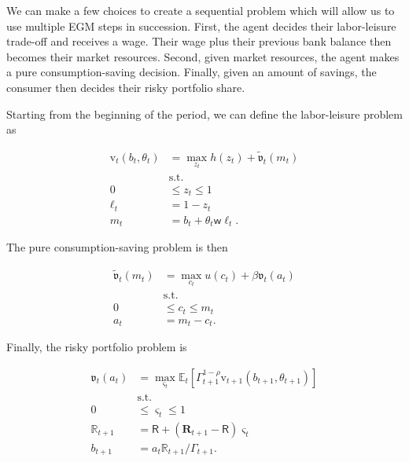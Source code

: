 \documentclass{article}
\newcommand{\DiscFac}{\beta}
\newcommand{\util}{u}
\newcommand{\tShkEmp}{\theta}
\newcommand{\Ex}{\mathbb{E}}
\newcommand{\CRRA}{\rho}
\newcommand{\h}{h}
\newcommand{\bRat}{b}
\newcommand{\leisure}{z}
\newcommand{\cRat}{c}
\newcommand{\vFunc}{\mathrm{v}}
\newcommand{\Rfree}{\mathsf{R}}
\newcommand{\wage}{\mathsf{w}}
\newcommand{\riskyshare}{\varsigma}
\newcommand{\PGro}{\Gamma}
\newcommand{\labor}{\ell}
\newcommand{\aRat}{a}
\newcommand{\mRat}{m}
\newcommand{\Rport}{\mathbb{R}}
\newcommand{\Risky}{\mathbf{R}}
\newcommand{\vOpt}{\tilde{\mathfrak{v}}}
\newcommand{\vEnd}{\mathfrak{v}}
\begin{document}
We can make a few choices to create a sequential problem which will allow us to use multiple EGM steps in succession. First, the
agent decides their labor-leisure trade-off and receives a wage. Their wage
plus their previous bank balance then becomes their market resources. Second, given
market resources, the agent makes a pure consumption-saving decision. Finally, given an amount of savings, the consumer then decides their risky portfolio share.

Starting from the beginning of the period, we can define the labor-leisure problem as

\begin{equation}
\begin{split}
    \vFunc_{t}(\bRat_{t}, \tShkEmp_{t}) & = \max_{ \leisure_{t}}
    \h(\leisure_{t}) + \vOpt_{t} (\mRat_{t}) \\
    & \text{s.t.} \\
    0 & \leq \leisure_{t} \leq 1 \\
    \labor_{t} & = 1 - \leisure_{t} \\
    \mRat_{t} & = \bRat_{t} + \tShkEmp_{t} \wage \labor_{t}.
  \end{split}
\end{equation}

The pure consumption-saving problem is then

\begin{equation}
\begin{split}
    \vOpt_{t}(\mRat_{t}) & = \max_{\cRat_{t}} \util(\cRat_{t}) + \DiscFac\vEnd_{t}(\aRat_{t}) \\
    & \text{s.t.} \\
    0 & \leq \cRat_{t} \leq \mRat_{t} \\
    \aRat_{t} & = \mRat_{t} - \cRat_{t}.
  \end{split}
\end{equation}

Finally, the risky portfolio problem is

\begin{equation}
\begin{split}
    \vEnd_{t}(\aRat_{t}) & = \max_{\riskyshare_{t}}
    \Ex_{t} \left[ \PGro_{t+1}^{1-\CRRA}
      \vFunc_{t+1}(\bRat_{t+1},
      \tShkEmp_{t+1}) \right] \\
    & \text{s.t.} \\
    0 & \leq \riskyshare_{t} \leq 1 \\
    \Rport_{t+1} & = \Rfree + (\Risky_{t+1} - \Rfree)
    \riskyshare_{t} \\
    \bRat_{t+1} & = \aRat_{t} \Rport_{t+1} / \PGro_{t+1}.
  \end{split}
\end{equation}
\end{document}
